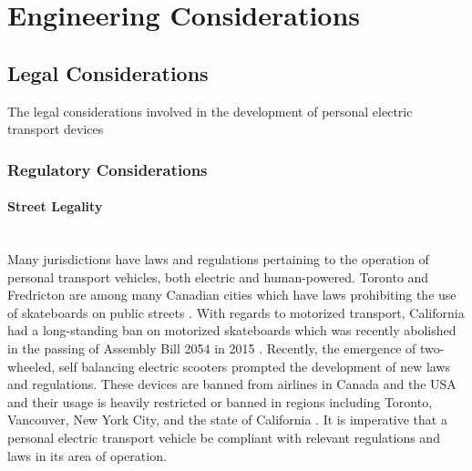 \section{Engineering Considerations}
\subsection{Legal Considerations}
The legal considerations involved in the development of personal electric transport devices 
\subsubsection{Regulatory Considerations}

\paragraph{Street Legality}\mbox{}\\
Many jurisdictions have laws and regulations pertaining to the operation of personal transport vehicles, both electric and human-powered. 
Toronto and Fredricton are among many Canadian cities which have laws prohibiting the use of skateboards on public streets \cite{TOLaws}. 
With regards to motorized transport, California had a long-standing ban on motorized skateboards which was recently abolished in the passing of Assembly Bill 2054 in 2015 \cite{OCLaws} \cite{WSJLaws}.
Recently, the emergence of two-wheeled, self balancing electric scooters prompted the development of new laws and regulations. 
These devices are banned from airlines in Canada and the USA and their usage is heavily restricted or banned in regions including Toronto, Vancouver, New York City, and the state of California \cite{leetboard}.
It is imperative that a personal electric transport vehicle be compliant with relevant regulations and laws in its area of operation.


